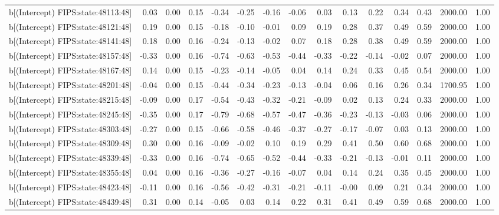 \begin{table}[ht]
\begin{tabular}{rrrrrrrrrrrrrrr}
  b[(Intercept) FIPS:state:48113:48] & 0.03 & 0.00 & 0.15 & -0.34 & -0.25 & -0.16 & -0.06 & 0.03 & 0.13 & 0.22 & 0.34 & 0.43 & 2000.00 & 1.00 \\ 
  b[(Intercept) FIPS:state:48121:48] & 0.19 & 0.00 & 0.15 & -0.18 & -0.10 & -0.01 & 0.09 & 0.19 & 0.28 & 0.37 & 0.49 & 0.59 & 2000.00 & 1.00 \\ 
  b[(Intercept) FIPS:state:48141:48] & 0.18 & 0.00 & 0.16 & -0.24 & -0.13 & -0.02 & 0.07 & 0.18 & 0.28 & 0.38 & 0.49 & 0.59 & 2000.00 & 1.00 \\ 
  b[(Intercept) FIPS:state:48157:48] & -0.33 & 0.00 & 0.16 & -0.74 & -0.63 & -0.53 & -0.44 & -0.33 & -0.22 & -0.14 & -0.02 & 0.07 & 2000.00 & 1.00 \\ 
  b[(Intercept) FIPS:state:48167:48] & 0.14 & 0.00 & 0.15 & -0.23 & -0.14 & -0.05 & 0.04 & 0.14 & 0.24 & 0.33 & 0.45 & 0.54 & 2000.00 & 1.00 \\ 
  b[(Intercept) FIPS:state:48201:48] & -0.04 & 0.00 & 0.15 & -0.44 & -0.34 & -0.23 & -0.13 & -0.04 & 0.06 & 0.16 & 0.26 & 0.34 & 1700.95 & 1.00 \\ 
  b[(Intercept) FIPS:state:48215:48] & -0.09 & 0.00 & 0.17 & -0.54 & -0.43 & -0.32 & -0.21 & -0.09 & 0.02 & 0.13 & 0.24 & 0.33 & 2000.00 & 1.00 \\ 
  b[(Intercept) FIPS:state:48245:48] & -0.35 & 0.00 & 0.17 & -0.79 & -0.68 & -0.57 & -0.47 & -0.36 & -0.23 & -0.13 & -0.03 & 0.06 & 2000.00 & 1.00 \\ 
  b[(Intercept) FIPS:state:48303:48] & -0.27 & 0.00 & 0.15 & -0.66 & -0.58 & -0.46 & -0.37 & -0.27 & -0.17 & -0.07 & 0.03 & 0.13 & 2000.00 & 1.00 \\ 
  b[(Intercept) FIPS:state:48309:48] & 0.30 & 0.00 & 0.16 & -0.09 & -0.02 & 0.10 & 0.19 & 0.29 & 0.41 & 0.50 & 0.60 & 0.68 & 2000.00 & 1.00 \\ 
  b[(Intercept) FIPS:state:48339:48] & -0.33 & 0.00 & 0.16 & -0.74 & -0.65 & -0.52 & -0.44 & -0.33 & -0.21 & -0.13 & -0.01 & 0.11 & 2000.00 & 1.00 \\ 
  b[(Intercept) FIPS:state:48355:48] & 0.04 & 0.00 & 0.16 & -0.36 & -0.27 & -0.16 & -0.07 & 0.04 & 0.14 & 0.24 & 0.35 & 0.45 & 2000.00 & 1.00 \\ 
  b[(Intercept) FIPS:state:48423:48] & -0.11 & 0.00 & 0.16 & -0.56 & -0.42 & -0.31 & -0.21 & -0.11 & -0.00 & 0.09 & 0.21 & 0.34 & 2000.00 & 1.00 \\ 
  b[(Intercept) FIPS:state:48439:48] & 0.31 & 0.00 & 0.14 & -0.05 & 0.03 & 0.14 & 0.22 & 0.31 & 0.41 & 0.49 & 0.59 & 0.68 & 2000.00 & 1.00 \\ 

\end{tabular}
\end{table}
